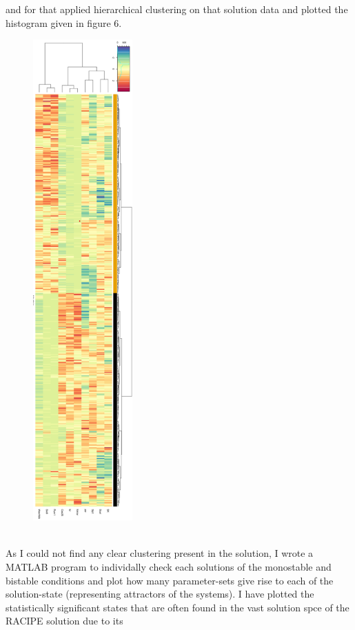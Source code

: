 \documentclass{article}
\begin{document}
and for that applied hierarchical clustering on that solution data and plotted 
the histogram given in figure 6.
\begin{figure}[H]
  \centering
  \includegraphics[width=38mm, scale=0.5]{hierarchical_clustering.png} \\
   \\
\end{figure}
\newpage
As I could not find any clear clustering present in the solution, I wrote a MATLAB 
program to individally check each solutions of the monostable and bistable conditions
and plot how many parameter-sets give rise to each of the solution-state (representing 
attractors of the systems). I have plotted the statistically significant states 
that are often found in the vast solution spce of the RACIPE solution due to its 
\end{document}
